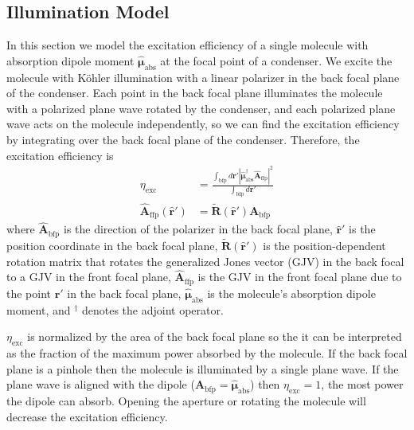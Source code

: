 \documentclass[11pt]{article}
\providecommand{\mb}[1]{\mathbf{#1}}
\providecommand{\mh}[1]{\mathbf{\hat{#1}}}
\providecommand{\bs}[1]{\boldsymbol{#1}}
\begin{document}
\subsection{Illumination Model}
In this section we model the excitation efficiency of a single molecule with absorption
dipole moment $\hat{\bs{\mu}}_{\text{abs}}$ at the focal point of a
condenser. We excite the molecule with K\"{o}hler illumination with a linear
polarizer in the back focal plane of the condenser. Each point in the back focal
plane illuminates the molecule with a polarized plane wave rotated
by the condenser, and each polarized plane wave acts on the molecule independently, so
we can find the excitation efficiency by integrating over the back focal plane of the condenser. Therefore, the excitation efficiency is
\begin{align}
  \eta_{\text{exc}} &= \frac{\int_{\text{bfp}} d\mathbf{r}'|\hat{\bs{\mu}}_{\text{abs}}^{\dagger}\mathbf{\hat{A}}_{\text{ffp}}|^2}{\int_{\text{bfp}}d\mathbf{r}'}\label{eq:illum}\\
\mathbf{\hat{A}}_{\text{ffp}}(\mh{r}') &= \tilde{\mb{R}}(\mh{r}')\mathbf{A}_{\text{bfp}} 
\end{align}
where $\mh{A}_{\text{bfp}}$ is the direction of the polarizer in the back focal
plane, $\mh{r}'$ is the position coordinate in the back focal plane,
$\tilde{\mb{R}}(\mh{r}')$ is the position-dependent rotation matrix that rotates
the generalized Jones vector (GJV) in the back focal to a GJV in the front focal
plane, $\mh{A}_{\text{ffp}}$ is the GJV in the front focal plane due to the
point $\mh{r}'$ in the back focal plane, $\hat{\bs{\mu}}_{\text{abs}}$ is the
molecule's absorption dipole moment, and ${}^{\dagger}$ denotes the adjoint
operator.

$\eta_{\text{exc}}$ is normalized by the area of the back focal plane so the it
can be interpreted as the fraction of the maximum power absorbed by the
molecule. If the back focal plane is a pinhole then the molecule is illuminated
by a single plane wave. If the plane wave is aligned with the dipole
($\mathbf{\hat{A}}_{\text{bfp}} = \hat{\bs{\mu}}_{\text{abs}}$) then
$\eta_{\text{exc}}=1$, the most power the dipole can absorb. Opening the
aperture or rotating the molecule will decrease the excitation efficiency.
\end{document}
